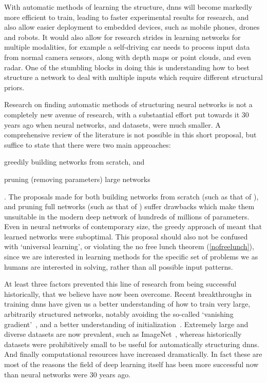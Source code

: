 \documentclass[thesis]{subfiles}
\begin{document}
With automatic methods of learning the structure, \glspl{dnn} will become markedly more efficient to train, leading to faster experimental results for research, and also allow easier deployment to embedded devices, such as mobile phones, drones and robots. It would also allow for research strides in learning networks for multiple modalities, for example a self-driving car needs to process input data from normal camera sensors, along with depth maps or point clouds, and even radar. One of the stumbling blocks in doing this is understanding how to best structure a network to deal with multiple inputs which require different structural priors.

Research on finding automatic methods of structuring neural networks is not a completely new avenue of research, with a substantial effort put towards it 30 years ago when neural networks, and datasets, were much smaller. A comprehensive review of the literature is not possible in this short proposal, but suffice to state that there were two main approaches:
\begin{enumerate*}[label= (\textbf{\roman*})]
	\item greedily building networks from scratch, and 
	\item pruning (removing parameters) large networks
\end{enumerate*}. The proposals made for both building networks from scratch (such as that of \citet{Fahlman1989}), and pruning full networks (such as that of \citet{lecun1989optimal}) suffer drawbacks which make them unsuitable in the modern deep network of hundreds of millions of parameters. Even in neural networks of contemporary size, the greedy approach of \citet{Fahlman1989} meant that learned networks were suboptimal. This proposal should also not be confused with `universal learning', or violating the no free lunch theorem (\cref{nofreelunch}), since we are interested in learning methods for the specific set of problems we as humans are interested in solving, rather than all possible input patterns.

At least three factors prevented this line of research from being successful historically, that we believe have now been overcome. Recent breakthroughs in training \glspl{dnn} have given us a better understanding of how to train very large, arbitrarily structured networks, notably avoiding the so-called `vanishing gradient'~\citep{Ioffe2015,He2016}, and a better understanding of initialization~\citep{He2015b}. Extremely large and diverse datasets are now prevalent, such as ImageNet~\citep{ILSVRC2015}, whereas historically datasets were prohibitively small to be useful for automatically structuring \glspl{dnn}. And finally computational resources have increased dramatically. In fact these are most of the reasons the field of deep learning itself has been more successful now than neural networks were 30 years ago.
\end{document}
